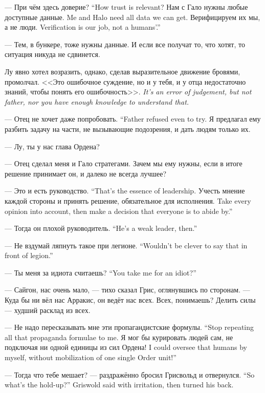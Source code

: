 {--- При чём здесь доверие?}
{``How trust is relevant?}
{Нам с Гало нужны любые доступные данные.}
{Me and Halo need all data we can get.}
{Верифицируем их мы, а не люди.}
{Verification is our job, not a humans'.''}

--- Тем, в бункере, тоже нужны данные.
И если все получат то, что хотят, то ситуация никуда не сдвинется.

Лу явно хотел возразить, однако, сделав выразительное движение бровями, промолчал.
{<<Это ошибочное суждение, но и у тебя, и у отца недостаточно знаний, чтобы понять его ошибочность>>.}
{\textit{It's an error of judgement, but not father, nor you have enough knowledge to understand that.}}

{--- Отец не хочет даже попробовать.}
{``Father refused even to try.}
Я предлагал ему разбить задачу на части, не вызывающие подозрения, и дать людям только их.

--- Лу, ты у нас глава Ордена?

--- Отец сделал меня и Гало стратегами.
Зачем мы ему нужны, если в итоге решение принимает он, и далеко не всегда лучшее?

{--- Это и есть руководство.}
{``That's the essence of leadership.}
{Учесть мнение каждой стороны и принять решение, обязательное для исполнения.}
{Take every opinion into account, then make a decision that everyone is to abide by.''}

{--- Тогда он плохой руководитель.}
{``He's a weak leader, then.''}

{--- Не вздумай ляпнуть такое при легионе.}
{``Wouldn't be clever to say that in front of legion.''}

{--- Ты меня за идиота считаешь?}
{``You take me for an idiot?''}

--- Сайгон, нас очень мало, --- тихо сказал Грис, оглянувшись по сторонам.
--- Куда бы ни вёл нас Арракис, он ведёт нас всех.
Всех, понимаешь?
Делить силы --- худший расклад из всех.

{--- Не надо пересказывать мне эти пропагандистские формулы.}
{``Stop repeating all that propaganda formulae to me.}
{Я мог бы курировать людей сам, не подключая ни одной единицы из сил Ордена!}
{I could oversee that humans by myself, without mobilization of one single Order unit!''}

{--- Тогда что тебе мешает? --- раздражённо бросил Грисвольд и отвернулся.}
{``So what's the hold-up?'' Griswold said with irritation, then turned his back.}

